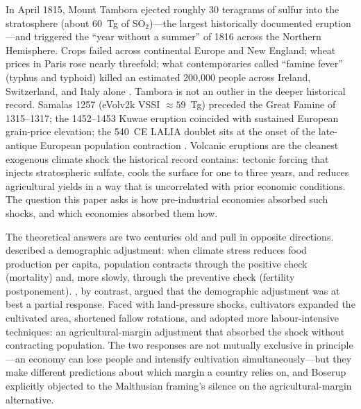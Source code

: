 \documentclass[11pt,letterpaper]{article}
\begin{document}
In April 1815, Mount Tambora ejected roughly 30 teragrams of sulfur into the stratosphere (about 60~Tg of SO$_2$)---the largest historically documented eruption---and triggered the ``year without a summer'' of 1816 across the Northern Hemisphere. Crops failed across continental Europe and New England; wheat prices in Paris rose nearly threefold; what contemporaries called ``famine fever'' (typhus and typhoid) killed an estimated 200{,}000 people across Ireland, Switzerland, and Italy alone \citep{wood2014year}. Tambora is not an outlier in the deeper historical record. Samalas 1257 (eVolv2k VSSI $\approx 59$~Tg) preceded the Great Famine of 1315--1317; the 1452--1453 Kuwae eruption coincided with sustained European grain-price elevation; the 540~CE LALIA doublet sits at the onset of the late-antique European population contraction \citep{buntgen2016cooling}. Volcanic eruptions are the cleanest exogenous climate shock the historical record contains: tectonic forcing that injects stratospheric sulfate, cools the surface for one to three years, and reduces agricultural yields in a way that is uncorrelated with prior economic conditions. The question this paper asks is how pre-industrial economies absorbed such shocks, and which economies absorbed them how.

The theoretical answers are two centuries old and pull in opposite directions. \citet{malthus1798} described a demographic adjustment: when climate stress reduces food production per capita, population contracts through the positive check (mortality) and, more slowly, through the preventive check (fertility postponement). \citet{boserup1965}, by contrast, argued that the demographic adjustment was at best a partial response. Faced with land-pressure shocks, cultivators expanded the cultivated area, shortened fallow rotations, and adopted more labour-intensive techniques: an agricultural-margin adjustment that absorbed the shock without contracting population. The two responses are not mutually exclusive in principle---an economy can lose people and intensify cultivation simultaneously---but they make different predictions about which margin a country relies on, and Boserup explicitly objected to the Malthusian framing's silence on the agricultural-margin alternative.
\end{document}
